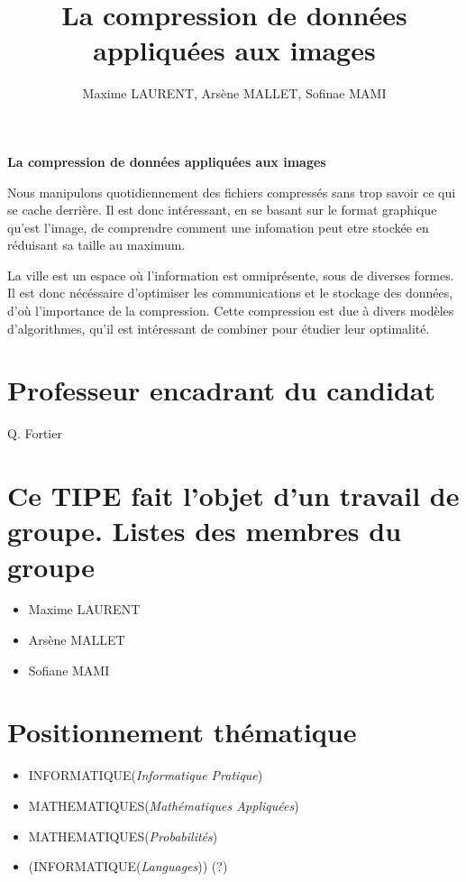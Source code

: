 \documentclass[a4paper, 11pt]{article}
\author{Maxime LAURENT, Arsène MALLET, Sofinae MAMI}
\title{La compression de donn\'ees appliqu\'ees aux images}
\begin{document}
    
\begin{center}
    {\textbf {\LARGE La compression de donn\'ees appliqu\'ees aux images}}
\end{center}

\vspace{5mm}

Nous manipulons quotidiennement des fichiers compressés sans trop savoir ce qui se cache derrière. Il est donc intéressant, en se basant sur le format graphique qu'est l'image, de comprendre comment une infomation peut etre stockée en réduisant sa taille au maximum.

La ville est un espace où l'information est omniprésente, sous de diverses formes. Il est donc nécéssaire d'optimiser les communications et le stockage des données, d'où l'importance de la compression. Cette compression est due à divers modèles d'algorithmes, qu'il est intéressant de combiner pour étudier leur optimalité. 

\section*{Professeur encadrant du candidat}
Q. Fortier

\section*{Ce TIPE fait l'objet d'un travail de groupe. \newline Listes des membres du groupe}
\begin{itemize}
    \item Maxime LAURENT
    \item Arsène MALLET
    \item Sofiane MAMI
\end{itemize}

\section*{Positionnement th\'ematique}
\begin{itemize}
    \item INFORMATIQUE(\textit{Informatique Pratique})
    \item MATHEMATIQUES(\textit{Math\'ematiques Appliqu\'ees})
    \item MATHEMATIQUES(\textit{Probabilit\'es})
    \item \scriptsize{(INFORMATIQUE(\textit{Languages}))} (?)
\end{itemize}
\end{document}
